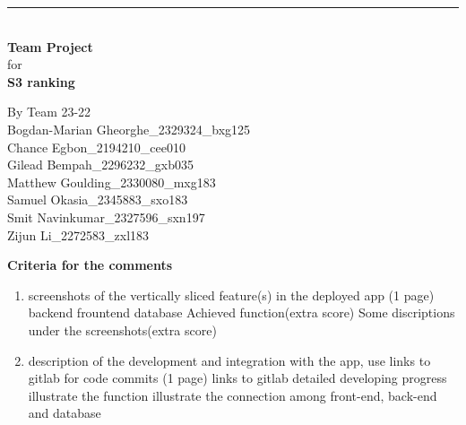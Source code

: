 \documentclass[a4paper]{article}
\begin{document}

\begin{titlepage}
	
	\rule{\linewidth}{5pt}
	\raggedleft
	\fontsize{38pt}{50pt}\selectfont
    \textbf{\\Team Project\\}
    \fontsize{28pt}{60pt}\selectfont 
    for\\
    \fontsize{38pt}{60pt}\selectfont 
    \textbf{S3 ranking\\}
	
	\vfill %
	
	
	\parbox[t]{0.93\textwidth}{ %
		\raggedleft %
		\large %
		{\Large By Team 23-22}\\[4pt] %
		Bogdan-Marian Gheorghe\_2329324\_bxg125\\
		Chance Egbon\_2194210\_cee010\\
		Gilead Bempah\_2296232\_gxb035\\
		Matthew Goulding\_2330080\_mxg183\\
		Samuel Okasia\_2345883\_sxo183\\
		Smit Navinkumar\_2327596\_sxn197\\
		Zijun Li\_2272583\_zxl183\\
	}
	
\end{titlepage}

\textbf{Criteria for the comments}

\begin{enumerate}
    \item screenshots of the vertically sliced feature(s) in the deployed app (1 page)
    \subitem backend
    \subitem frountend
    \subitem database
    \subitem Achieved function(extra score)
    \subitem Some discriptions under the screenshots(extra score)
    \item description of the development and integration with the app, use links to gitlab for code commits (1 page)
    \subitem links to gitlab
    \subitem detailed developing progress
    \subitem illustrate the function
    \subitem illustrate the connection among front-end, back-end and database
\end{enumerate}
\end{document}
